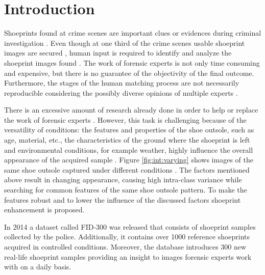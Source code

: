 \documentclass[draft,final]{vutinfth} %
\begin{document}
\chapter{Introduction}
\raggedbottom
\par
Shoeprints found at crime scenes are important clues or evidences during criminal investigation \cite{kong2014novel}.
Even though at one third of the crime scenes usable shoeprint images are secured \cite{alexandre1996computerized}, human input is required to identify and analyze the shoeprint images found \cite{wang2014automatic}.
The work of forensic experts is not only time consuming and expensive, but there is no guarantee of the objectivity of the final outcome\cite{gueham2008automatic}.
Furthermore, the stages of the human matching process are not necessarily reproducible considering the possibly diverse opinions of multiple experts \cite{damary2018dependence}.
\par
There is an excessive amount of research already done in order to help or replace the work of forensic experts \cite{rida2019forensic}. 
However, this task is challenging because of the versatility of conditions: the features and properties of the shoe outsole, such as age, material, etc., the characteristics of the ground where the shoeprint is left and environmental conditions, for example weather, highly influence the overall appearance of the acquired sample \cite{kortylewski2014unsupervised}.
Figure \ref{fig:int:varying} shows images of the same shoe outsole captured under different conditions \cite{kortylewski2014unsupervised}. 
The factors mentioned above result in changing appearance, causing high intra-class variance while searching for common features of the same shoe outsole pattern.
To make the features robust and to lower the influence of the discussed factors shoeprint enhancement is proposed.
\par
In 2014 a dataset called FID-300 \cite{kortylewski2014unsupervised} was released that consists of shoeprint samples collected by the police. 
Additionally, it contains over 1000 reference shoeprints acquired in controlled conditions.
Moreover, the database introduces 300 new real-life shoeprint samples providing an insight to images forensic experts work with on a daily basis.
\end{document}

